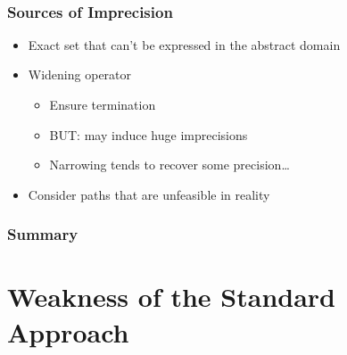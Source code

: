 \documentclass{beamer}
\begin{document}
\begin{frame}
\begin{itemize}
 \hspace{3cm}~

\end{itemize}

\bigskip

\end{frame}


\begin{frame}
\frametitle{Sources of Imprecision}
\begin{itemize}
\item<1-> Exact set that can't be expressed in the abstract domain
\item<2-> \alert<4>{Widening operator}
\begin{itemize}
\item Ensure termination
\item BUT: may induce huge imprecisions
\item Narrowing tends to recover some precision\ldots
\end{itemize}
\item<3-> \alert<4>{Consider paths that are unfeasible in reality}
\end{itemize}
\end{frame}

\begin{frame}
\frametitle{Summary}
\tableofcontents
\end{frame}


\section[Standard Approach]{Weakness of the Standard Approach}
\end{document}
